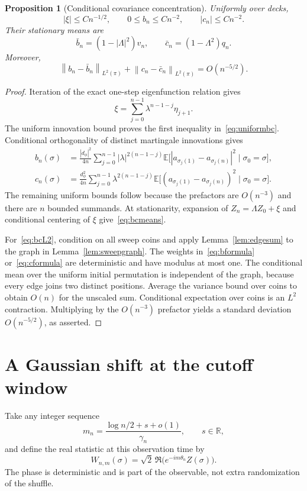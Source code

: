 \documentclass[11pt]{article}
\newtheorem{proposition}[theorem]{Proposition}
\theoremstyle{remark}
\newcommand{\E}{\mathbb E}
\newcommand{\R}{\mathbb R}
\newcommand{\norm}[1]{\left\lVert #1\right\rVert}
\begin{document}
\begin{proposition}[Conditional covariance concentration]\label{prop:bracket}
Uniformly over decks,
\begin{equation}\label{eq:uniformbc}
 |\xi|\leq Cn^{-1/2},\qquad 0\leq b_n\leq Cn^{-2},\qquad |c_n|\leq Cn^{-2}.
\end{equation}
Their stationary means are
\begin{equation}\label{eq:bcmeans}
 \bar b_n=(1-|\Lambda|^2)v_n,\qquad
 \bar c_n=(1-\Lambda^2)q_n.
\end{equation}
Moreover,
\begin{equation}\label{eq:bcL2}
 \norm{b_n-\bar b_n}_{L^2(\pi)}+
 \norm{c_n-\bar c_n}_{L^2(\pi)}=O(n^{-5/2}).
\end{equation}
\end{proposition}
\begin{proof}
Iteration of the exact one-step eigenfunction relation gives
\[
 \xi=\sum_{j=0}^{n-1}\lambda^{n-1-j}\eta_{j+1}.
\]
The uniform innovation bound proves the first inequality in~\eqref{eq:uniformbc}. Conditional orthogonality of distinct martingale innovations gives
\begin{align}
 b_n(\sigma)&=\frac{|d_\phi|^2}{4n}\sum_{j=0}^{n-1}|\lambda|^{2(n-1-j)}
 \E\bigl[|a_{\sigma_j(1)}-a_{\sigma_j(n)}|^2\mid\sigma_0=\sigma\bigr],\label{eq:bformula}\\
 c_n(\sigma)&=\frac{d_\phi^2}{4n}\sum_{j=0}^{n-1}\lambda^{2(n-1-j)}
 \E\bigl[(a_{\sigma_j(1)}-a_{\sigma_j(n)})^2\mid\sigma_0=\sigma\bigr].\label{eq:cformula}
\end{align}
The remaining uniform bounds follow because the prefactors are $O(n^{-3})$ and there are $n$ bounded summands. At stationarity, expansion of
$Z_n=\Lambda Z_0+\xi$ and conditional centering of $\xi$ give~\eqref{eq:bcmeans}.

For~\eqref{eq:bcL2}, condition on all sweep coins and apply Lemma~\ref{lem:edgesum} to the graph in Lemma~\ref{lem:sweepgraph}. The weights in~\eqref{eq:bformula} or~\eqref{eq:cformula} are deterministic and have modulus at most one. The conditional mean over the uniform initial permutation is independent of the graph, because every edge joins two distinct positions. Average the variance bound over coins to obtain $O(n)$ for the unscaled sum. Conditional expectation over coins is an $L^2$ contraction. Multiplying by the $O(n^{-3})$ prefactor yields a standard deviation $O(n^{-5/2})$, as asserted.
\end{proof}

\section{A Gaussian shift at the cutoff window}\label{sec:clt}
Take any integer sequence
\[
 m_n=\frac{\log n/2+s+o(1)}{\gamma_n},\qquad s\in\R,
\]
and define the real statistic at this observation time by
\begin{equation}\label{eq:W}
 W_{n,m}(\sigma)=\sqrt2\,\Re\bigl(e^{-im\theta_n}Z(\sigma)\bigr).
\end{equation}
The phase is deterministic and is part of the observable, not extra randomization of the shuffle.
\end{document}
